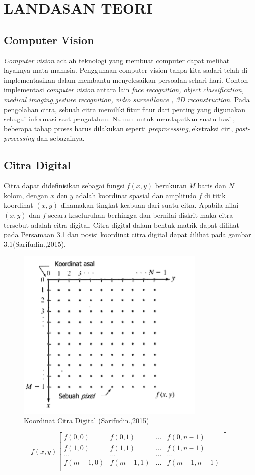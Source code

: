 \chapter{LANDASAN TEORI}
\section{Computer Vision}
\emph{Computer vision} adalah teknologi yang membuat computer dapat melihat layaknya mata manusia. Penggunaan computer vision tanpa kita sadari telah di implementasikan dalam membantu menyelesaikan persoalan sehari hari. Contoh implementasi \emph{computer vision} antara lain \emph{face recognition, object classification, medical imaging,gesture recognition, video surveillance , 3D reconstruction}. Pada pengolahan citra, sebuah citra memiliki fitur fitur dari penting yang digunakan sebagai informasi saat pengolahan. Namun untuk mendapatkan suatu hasil, beberapa tahap proses harus dilakukan seperti \emph{preprocessing}, ekstraksi ciri, \emph{post-processing} dan sebagainya.
\section{Citra Digital}
Citra dapat didefinisikan sebagai fungsi \(f(x,y)\) berukuran \(M\) baris dan \(N\) kolom, dengan \(x\)  dan \(y\) adalah koordinat spasial dan amplitudo \(f\)  di titik koordinat \((x,y)\) dinamakan tingkat keabuan dari suatu citra. Apabila nilai \((x,y)\) dan \(f\) secara keseluruhan berhingga dan bernilai diskrit maka citra tersebut adalah citra digital. Citra digital dalam bentuk matrik dapat dilihat pada Persamaan 3.1 dan posisi koordinat citra digital dapat dilihat pada gambar 3.1(Sarifudin.,2015).

\begin{figure}[H]
	\centering
	\includegraphics[width=0.3\linewidth]{screenshot001}
	\caption{Koordinat Citra Digital (Sarifudin.,2015)}
	\label{fig:screenshot001}
\end{figure}
\begin{equation}
f(x,y)
\begin{bmatrix}
f(0,0) & f(0,1) & ... & f(0,n-1)\\
f(1,0) & f(1,1) & ... & f(1,n-1)\\
... & ... & ... & ...\\
f(m-1,0) & f(m-1,1) & ... & f(m-1,n-1)\\
\end{bmatrix}
\end{equation}

